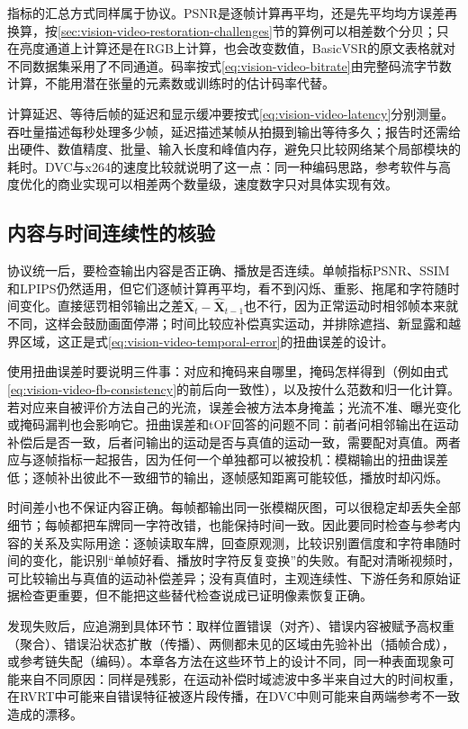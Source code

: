 指标的汇总方式同样属于协议。PSNR是逐帧计算再平均，还是先平均均方误差再换算，按\ref{sec:vision-video-restoration-challenges}节的算例可以相差数个分贝；只在亮度通道上计算还是在RGB上计算，也会改变数值，BasicVSR的原文表格就对不同数据集采用了不同通道。码率按式\eqref{eq:vision-video-bitrate}由完整码流字节数计算，不能用潜在张量的元素数或训练时的估计码率代替。

计算延迟、等待后帧的延迟和显示缓冲要按式\eqref{eq:vision-video-latency}分别测量。吞吐量描述每秒处理多少帧，延迟描述某帧从拍摄到输出等待多久；报告时还需给出硬件、数值精度、批量、输入长度和峰值内存，避免只比较网络某个局部模块的耗时。DVC与x264的速度比较就说明了这一点：同一种编码思路，参考软件与高度优化的商业实现可以相差两个数量级，速度数字只对具体实现有效。

\subsection{内容与时间连续性的核验}
\label{sec:vision-video-temporal-quality}

协议统一后，要检查输出内容是否正确、播放是否连续。单帧指标PSNR、SSIM和LPIPS仍然适用，但它们逐帧计算再平均，看不到闪烁、重影、拖尾和字符随时间变化。直接惩罚相邻输出之差$\widehat{\bm{X}}_t-\widehat{\bm{X}}_{t-1}$也不行，因为正常运动时相邻帧本来就不同，这样会鼓励画面停滞；时间比较应补偿真实运动，并排除遮挡、新显露和越界区域，这正是式\eqref{eq:vision-video-temporal-error}的扭曲误差的设计。

使用扭曲误差时要说明三件事：对应和掩码来自哪里，掩码怎样得到（例如由式\eqref{eq:vision-video-fb-consistency}的前后向一致性），以及按什么范数和归一化计算。若对应来自被评价方法自己的光流，误差会被方法本身掩盖；光流不准、曝光变化或掩码漏判也会影响它。扭曲误差和tOF回答的问题不同：前者问相邻输出在运动补偿后是否一致，后者问输出的运动是否与真值的运动一致，需要配对真值。两者应与逐帧指标一起报告，因为任何一个单独都可以被投机：模糊输出的扭曲误差低；逐帧补出彼此不一致细节的输出，逐帧感知距离可能较低，播放时却闪烁。

时间差小也不保证内容正确。每帧都输出同一张模糊灰图，可以很稳定却丢失全部细节；每帧都把车牌同一字符改错，也能保持时间一致。因此要同时检查与参考内容的关系及实际用途：逐帧读取车牌，回查原观测，比较识别置信度和字符串随时间的变化，能识别“单帧好看、播放时字符反复变换”的失败。有配对清晰视频时，可比较输出与真值的运动补偿差异；没有真值时，主观连续性、下游任务和原始证据检查更重要，但不能把这些替代检查说成已证明像素恢复正确。

发现失败后，应追溯到具体环节：取样位置错误（对齐）、错误内容被赋予高权重（聚合）、错误沿状态扩散（传播）、两侧都未见的区域由先验补出（插帧合成），或参考链失配（编码）。本章各方法在这些环节上的设计不同，同一种表面现象可能来自不同原因：同样是残影，在运动补偿时域滤波中多半来自过大的时间权重，在RVRT中可能来自错误特征被逐片段传播，在DVC中则可能来自两端参考不一致造成的漂移。

